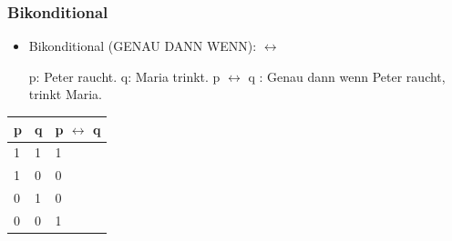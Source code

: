 
\begin{frame}
\frametitle{Bikonditional}

\begin{itemize}
	\item Bikonditional (GENAU DANN WENN): $\leftrightarrow$
	
	\eal
		\ex p: Peter raucht.
		\ex q: Maria trinkt.
		\ex p $\leftrightarrow$ q : Genau dann wenn Peter raucht, trinkt Maria.
	\zl

\end{itemize}


\begin{table}
\centering

\begin{tabular}{p{2cm}|p{2cm}|p{2cm}}
\textbf{p} & \textbf{q} & \textbf{p} $\leftrightarrow$ \textbf{q}\\
\hline
1 & 1 & 1\\
\hline
1 & 0 & 0\\
\hline
0 & 1 & 0\\
\hline 
0 & 0 & 1\\
\end{tabular}

\end{table}

\end{frame}


